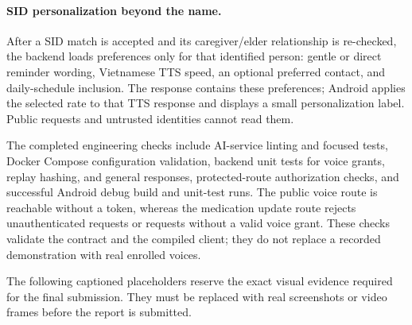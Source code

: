 \paragraph{SID personalization beyond the name.} After a SID match is accepted and its caregiver/elder relationship is re-checked, the backend loads preferences only for that identified person: gentle or direct reminder wording, Vietnamese TTS speed, an optional preferred contact, and daily-schedule inclusion. The response contains these preferences; Android applies the selected rate to that TTS response and displays a small personalization label. Public requests and untrusted identities cannot read them.

The completed engineering checks include AI-service linting and focused tests, Docker Compose configuration validation, backend unit tests for voice grants, replay hashing, and general responses, protected-route authorization checks, and successful Android debug build and unit-test runs. The public voice route is reachable without a token, whereas the medication update route rejects unauthenticated requests or requests without a valid voice grant. These checks validate the contract and the compiled client; they do not replace a recorded demonstration with real enrolled voices.

The following captioned placeholders reserve the exact visual evidence required for the final submission. They must be replaced with real screenshots or video frames before the report is submitted.


